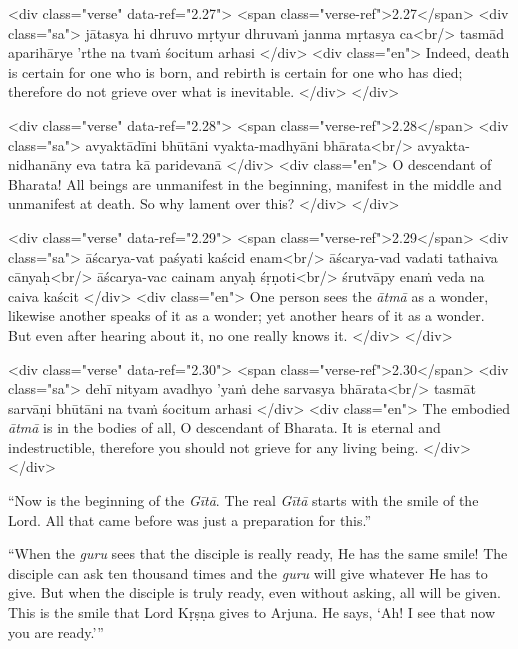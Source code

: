 \begin{html}
<div class="verse" data-ref="2.27">
  <span class="verse-ref">2.27</span>
  <div class="sa">
    jātasya hi dhruvo mṛtyur dhruvaṁ janma mṛtasya ca<br/>
    tasmād aparihārye ’rthe na tvaṁ śocitum arhasi
  </div>
  <div class="en">
    Indeed, death is certain for one who is born, and rebirth is certain for one who has died; therefore do not grieve over what is inevitable.
  </div>
</div>
\end{html}



\begin{html}
<div class="verse" data-ref="2.28">
  <span class="verse-ref">2.28</span>
  <div class="sa">
    avyaktādīni bhūtāni vyakta-madhyāni bhārata<br/>
    avyakta-nidhanāny eva tatra kā paridevanā
  </div>
  <div class="en">
    O descendant of Bharata! All beings are unmanifest in the beginning, manifest in the middle and unmanifest at death. So why lament over this?
  </div>
</div>
\end{html}



\begin{html}
<div class="verse" data-ref="2.29">
  <span class="verse-ref">2.29</span>
  <div class="sa">
    āścarya-vat paśyati kaścid enam<br/>
    āścarya-vad vadati tathaiva cānyaḥ<br/>
    āścarya-vac cainam anyaḥ śṛṇoti<br/>
    śrutvāpy enaṁ veda na caiva kaścit
  </div>
  <div class="en">
    One person sees the \textit{ātmā} as a wonder, likewise another speaks of it as a wonder; yet another hears of it as a wonder. But even after hearing about it, no one really knows it.
  </div>
</div>
\end{html}



\begin{html}
<div class="verse" data-ref="2.30">
  <span class="verse-ref">2.30</span>
  <div class="sa">
    dehī nityam avadhyo ’yaṁ dehe sarvasya bhārata<br/>
    tasmāt sarvāṇi bhūtāni na tvaṁ śocitum arhasi
  </div>
  <div class="en">
    The embodied \textit{ātmā} is in the bodies of all, O descendant of Bharata. It is eternal and indestructible, therefore you should not grieve for any living being.
  </div>
</div>
\end{html}


\enquote{Now is the beginning of the \textit{Gītā}. The real \textit{Gītā} starts with the smile of the Lord. All that came before was just a preparation for this.}

\enquote{When the \textit{guru} sees that the disciple is really ready, He has the same smile! The disciple can ask ten thousand times and the \textit{guru} will give whatever He has to give. But when the disciple is truly ready, even without asking, all will be given. This is the smile that Lord Kṛṣṇa gives to Arjuna. He says, \enquote{Ah! I see that now you are ready.}}

